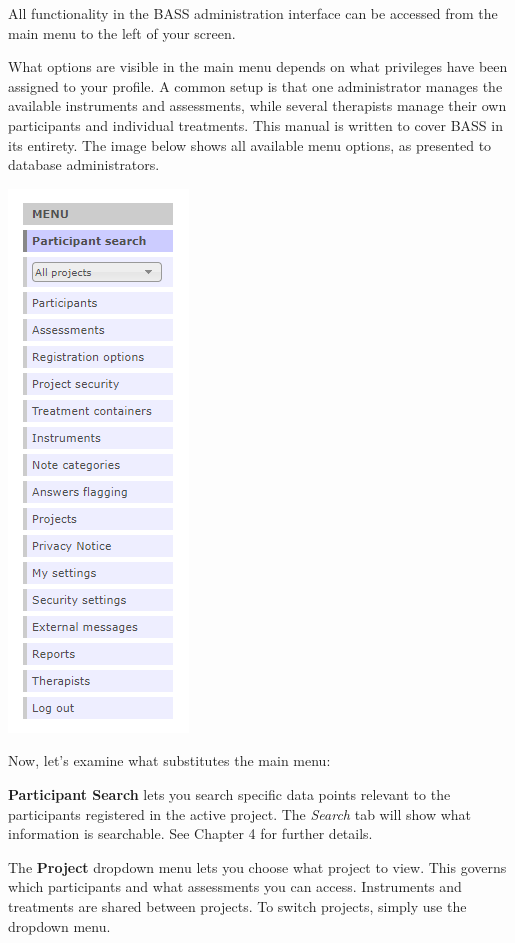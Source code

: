 \documentclass[]{book}
\begin{document}
All functionality in the BASS administration interface can be accessed from the main menu to the left of your screen.

What options are visible in the main menu depends on what privileges have been assigned to your profile. A common setup is that one administrator manages the available instruments and assessments, while several therapists manage their own participants and individual treatments. This manual is written to cover BASS in its entirety. The image below shows all available menu options, as presented to database administrators.

\includegraphics{images/main-menu.png}

Now, let's examine what substitutes the main menu:

\textbf{Participant Search} lets you search specific data points relevant to the participants registered in the active project. The \emph{Search} tab will show what information is searchable. See Chapter 4 for further details.

The \textbf{Project} dropdown menu lets you choose what project to view. This governs which participants and what assessments you can access. Instruments and treatments are shared between projects. To switch projects, simply use the dropdown menu.
\end{document}
